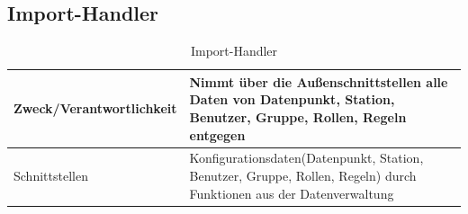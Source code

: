 \subsection{Import-Handler}
\begin{table}[th]
	\begin{tabularx}{\textwidth}{p{5cm} X}
		\hline
		Zweck/Verantwortlichkeit & Nimmt über die Außenschnittstellen alle Daten von Datenpunkt, Station, Benutzer, Gruppe, Rollen, Regeln entgegen \\
		\hline
		Schnittstellen & Konfigurationsdaten(Datenpunkt, Station, Benutzer, Gruppe, Rollen, Regeln) durch Funktionen aus der Datenverwaltung \\
		\hline
	\end{tabularx} 
	\caption{Import-Handler}
	\label{tab:Import-Handler}
\end{table}